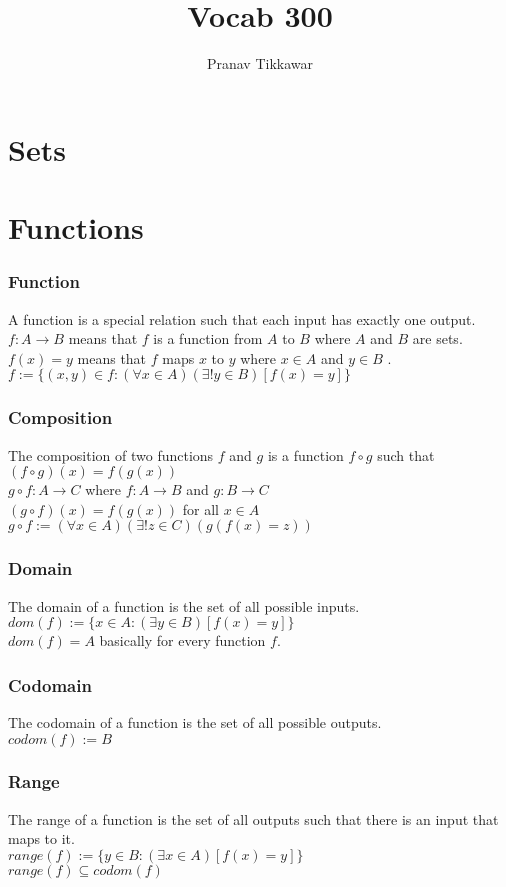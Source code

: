 \documentclass{article}
\author{Pranav Tikkawar}
\title{Vocab 300}
\begin{document}
\maketitle

\section{Sets}

\section{Functions}
\subsubsection*{Function}
A function is a special relation such that each input has exactly one output.\\
$f : A \rightarrow B$ means that $f$ is a function from $A$ to $B$ where $A$ and $B$ are sets.\\
$f(x) = y$ means that $f$ maps $x$ to $y$ where $x\in A$ and $y \in B$ .\\
$f := \{(x,y) \in f : (\forall x \in A)(\exists! y \in B)[f(x) = y]\}$
\subsubsection*{Composition}
The composition of two functions $f$ and $g$ is a function $f \circ g$ such that $(f \circ g)(x) = f(g(x))$\\
$g \circ f: A \rightarrow C$ where $f : A \rightarrow B$ and $g : B \rightarrow C$\\
$(g \circ f)(x) = f(g(x))$ for all $x \in A$\\
$g \circ f := (\forall x \in A)(\exists! z \in C)(g(f(x) = z) )$
\subsubsection*{Domain}
The domain of a function is the set of all possible inputs.\\
$dom(f) := \{x \in A : (\exists y \in B)[f(x) = y]\}$ \\ 
$dom(f) = A$ basically for every function $f$.
\subsubsection*{Codomain}
The codomain of a function is the set of all possible outputs.\\
$codom(f) := B$
\subsubsection*{Range}
The range of a function is the set of all outputs such that there is an input that maps to it.\\
$range(f) := \{y \in B : (\exists x \in A)[f(x) = y]\}$\\
$range(f) \subseteq codom(f)$
\end{document}
